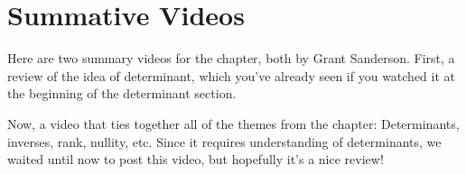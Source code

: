 \documentclass{ximera}
\begin{document}
\section*{Summative Videos}

Here are two summary videos for the chapter, both by Grant Sanderson. First, a review of the idea of determinant, which you've already seen if you watched it at the beginning of the determinant section.

\begin{center}
\end{center}

Now, a video that ties together all of the themes from the chapter: Determinants, inverses, rank, nullity, etc. Since it requires understanding of determinants, we waited until now to post this video, but hopefully it's a nice review!

\begin{center}
\end{center}
\end{document}
